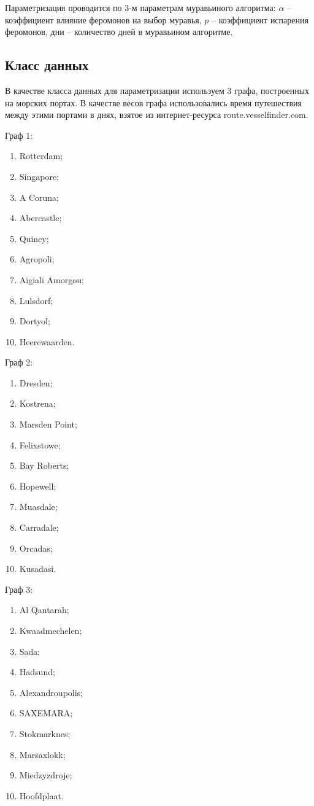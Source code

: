 Параметризация проводится по 3-м параметрам муравьиного алгоритма: $\alpha$ -- коэффициент влияние феромонов на выбор муравья, $p$ -- коэффициент испарения феромонов, дни -- количество дней в муравьином алгоритме.

\subsection{Класс данных}

В качестве класса данных для параметризации используем 3 графа, построенных на морских портах. В качестве весов графа использовались время путешествия между этими портами в днях, взятое из интернет-ресурса route.vesselfinder.com.

Граф 1:
\begin{enumerate}
    \item Rotterdam;
    \item Singapore;
    \item A Coruna;
    \item Abercastle;
    \item Quincy;
    \item Agropoli;
    \item Aigiali Amorgou;
    \item Lulsdorf;
    \item Dortyol;
    \item Heerewaarden.
\end{enumerate}

Граф 2:
\begin{enumerate}
    \item Dresden;
    \item Kostrena;
    \item Marsden Point;
    \item Felixstowe;
    \item Bay Roberts;
    \item Hopewell;
    \item Muasdale;
    \item Carradale;
    \item Orcadas;
    \item Kusadasi.
\end{enumerate}

Граф 3:
\begin{enumerate}
    \item Al Qantarah;
    \item Kwaadmechelen;
    \item Sada;
    \item Hadsund;
    \item Alexandroupolis;
    \item SAXEMARA;
    \item Stokmarknes;
    \item Marsaxlokk;
    \item Miedzyzdroje;
    \item Hoofdplaat.
\end{enumerate}


